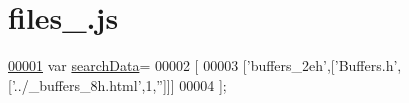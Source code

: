 \hypertarget{files__0_8js_source}{}\section{files\+\_.\+js}
\label{files__0_8js_source}

\begin{DoxyCode}
\hypertarget{files__0_8js_source.tex_l00001}{}\hyperlink{files__0_8js_ad01a7523f103d6242ef9b0451861231e}{00001} var \hyperlink{files__0_8js_ad01a7523f103d6242ef9b0451861231e}{searchData}=
00002 [
00003   [\textcolor{stringliteral}{'buffers\_2eh'},[\textcolor{stringliteral}{'Buffers.h'},[\textcolor{stringliteral}{'../\_buffers\_8h.html'},1,\textcolor{stringliteral}{''}]]]
00004 ];
\end{DoxyCode}

